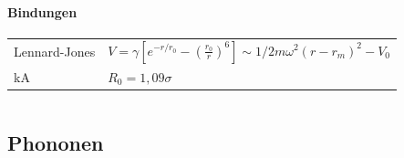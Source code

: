 \documentclass[12pt,a4paper]{article}
\renewcommand{\=}[1]{\stackrel{#1}{=}}
\theoremstyle{definition}
\theoremstyle{remark}
\begin{document}
\paragraph{Bindungen}

\begin{center}
\begin{minipage}[t]{.35\linewidth}
\vspace{0pt}
\noindent\begin{tabular}{ll}
\toprule
Lennard-Jones & $V = \gamma [ e^{-r/r_0} - (\frac{r_0}{r})^6 ] \sim 1/2 m \omega^2 (r-r_m)^2 - V_0$\\
kA & $R_0 = 1,09 \sigma$\\
\bottomrule
\end{tabular}
\end{minipage}%
\begin{minipage}[t]{.65\linewidth}
\vspace{0pt}
\begin{tabular}{ll}
\toprule


\end{tabular}
\end{minipage}
\end{center}




\subsection{Phononen}
\end{document}
